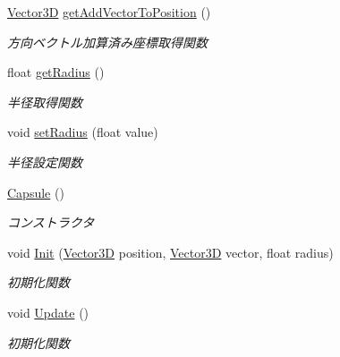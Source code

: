 \begin{DoxyCompactItemize}
\mbox{\hyperlink{class_vector3_d}{Vector3D}} \mbox{\hyperlink{class_capsule_a32991dc5e0331f716302ce73a8f9fd2f}{get\+Add\+Vector\+To\+Position}} ()
\begin{DoxyCompactList}\small\item\em 方向ベクトル加算済み座標取得関数 \end{DoxyCompactList}\item 
float \mbox{\hyperlink{class_capsule_a4e98e8545ea57fe682c5a2002bd49bdb}{get\+Radius}} ()
\begin{DoxyCompactList}\small\item\em 半径取得関数 \end{DoxyCompactList}\item 
void \mbox{\hyperlink{class_capsule_a42d2233293d60384377ab4f4213be612}{set\+Radius}} (float value)
\begin{DoxyCompactList}\small\item\em 半径設定関数 \end{DoxyCompactList}\item 
\mbox{\hyperlink{class_capsule_a4324279c9cc08241083b53c3a3dec44c}{Capsule}} ()
\begin{DoxyCompactList}\small\item\em コンストラクタ \end{DoxyCompactList}\item 
void \mbox{\hyperlink{class_capsule_a89dc585afa88e50e84a2f98bbf0bb400}{Init}} (\mbox{\hyperlink{class_vector3_d}{Vector3D}} position, \mbox{\hyperlink{class_vector3_d}{Vector3D}} vector, float radius)
\begin{DoxyCompactList}\small\item\em 初期化関数 \end{DoxyCompactList}\item 
void \mbox{\hyperlink{class_capsule_af53f19ae224208814b21238c3661a643}{Update}} ()
\begin{DoxyCompactList}\small\item\em 初期化関数 \end{DoxyCompactList}\end{DoxyCompactItemize}
